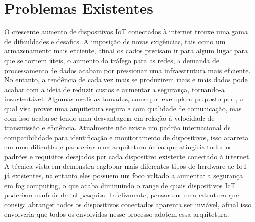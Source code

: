 \documentclass[article,12pt]{abntex2}
\begin{document}
\section{Problemas Existentes}
O crescente aumento de dispositivos IoT conectados à internet trouxe uma gama de dificuldades e desafios. A imposição de novas exigências, tais como um armazenamento mais eficiente, afinal os dados precisam ir para algum lugar para que se tornem úteis, o aumento do tráfego para as redes, a demanda de processamento de dados acabam por pressionar uma infraestrutura mais eficiente. No entanto, a tendência de cada vez mais se produzirem mais e mais dados pode acabar com a ideia de reduzir custos e aumentar a segurança, tornando-a insustentável. Algumas medidas tomadas, como por exemplo o proposto por  \cite{Stergiou:2017}, a qual visa prover uma arquitetura segura e com qualidade de comunicação, mas com isso acaba-se tendo uma desvantagem em relação à velocidade de transmissão e eficiência.
\newline
Atualmente não existe um padrão internacional de compatibilidade para identificação e monitoramento de dispositivos, isso acarreta em uma dificuldade para criar uma arquitetura única que atingiria todos os padrões e requisitos desejados por cada dispositivo existente conectado à internet. A técnica vista em \cite{Li:2019} demonstra englobar mais diferentes tipos de hardware de IoT já existentes, no entanto eles possuem um foco voltado a aumentar a segurança em fog computing, o que acaba diminuindo o range de quais dispositivos IoT poderiam usufruir de tal pesquisa. Infelizmente, pensar em uma estrutura que consiga abranger todos os dispositivos conectados aparenta ser inviável, afinal isso envolveria que todos os envolvidos nesse processo adotem essa arquitetura.
\end{document}
